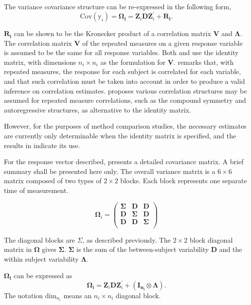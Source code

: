 \documentclass[12pt, a4paper]{article}
\theoremstyle{plain}
\theoremstyle{definition}
\theoremstyle{remark}
\begin{document}
The variance covariance structure can be re-expressed in the following form,
\[
\mbox{Cov}(\mbox{y}_{i}) = \boldsymbol{\Omega_{i}} = \boldsymbol{Z}_{i}\boldsymbol{D}\boldsymbol{Z}_{i}^\prime + \boldsymbol{R_{i}}.
\]

$\boldsymbol{R_{i}}$ can be shown to be the Kronecker product of a correlation matrix $\boldsymbol{V}$ and $\boldsymbol{\Lambda}$. The correlation matrix $\boldsymbol{V}$ of the repeated measures on a given response variable is assumed to be the same for all response variables. Both \citet{hamlett} and \citet{lam} use the identity matrix, with dimensions $n_{i} \times n_{i}$ as the formulation for $\boldsymbol{V}$. \citet{roy} remarks that, with repeated measures, the response for each subject is correlated for each variable, and that such correlation must be taken into account in order to produce a valid inference on correlation estimates.  \citet{roy2006} proposes various correlation structures may be assumed for repeated measure correlations, such as the compound symmetry and autoregressive structures, as alternative to the identity matrix.

However, for the purposes of method comparison studies, the necessary estimates are currently only determinable when the identity matrix is specified, and the results in \citet{roy} indicate its use.

For the response vector described, \citet{hamlett} presents a detailed covariance matrix. A brief summary shall be presented here only. The overall variance matrix is a $6 \times 6$ matrix composed of two types of $2 \times 2$ blocks. Each block represents one separate time of measurement.

\[
\boldsymbol{\Omega}_{i} = \left(
\begin{array}{ccc}
  \boldsymbol{\Sigma} & \boldsymbol{D} & \boldsymbol{D}\\
  \boldsymbol{D} & \boldsymbol{\Sigma} & \boldsymbol{D}\\
  \boldsymbol{D} & \boldsymbol{D} & \boldsymbol{\Sigma}\\
\end{array}\right)
\]

The diagonal blocks are $\Sigma$, as described previously. The $2 \times 2$ block diagonal matrix in $\boldsymbol{\Omega}$ gives $\boldsymbol{\Sigma}$. $\boldsymbol{\Sigma}$ is the sum of the between-subject variability $\boldsymbol{D}$ and the within subject variability $\boldsymbol{\Lambda}$.

$\boldsymbol{\Omega_{i}}$ can be expressed as
\[
\boldsymbol{\Omega_{i}} = \boldsymbol{Z}_{i}\boldsymbol{D}\boldsymbol{Z}_{i}^\prime + ({\boldsymbol{I_{n_{i}}} \otimes \boldsymbol{\Lambda}}).
\]
The notation $\mbox{dim}_{n_{i}}$ means an $n_{i} \times n_{i}$ diagonal block.
\end{document}
